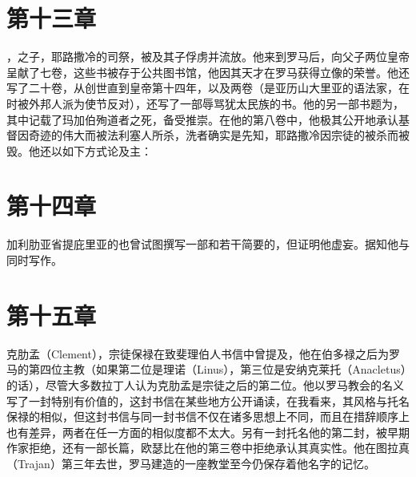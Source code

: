 
\section{第十三章}

，之子，耶路撒冷的司祭，被及其子俘虏并流放。他来到罗马后，向父子两位皇帝呈献了七卷，这些书被存于公共图书馆，他因其天才在罗马获得立像的荣誉。他还写了二十卷，从创世直到皇帝第十四年，以及两卷（是亚历山大里亚的语法家，在时被外邦人派为使节反对），还写了一部辱骂犹太民族的书。他的另一部书题为，其中记载了玛加伯殉道者之死，备受推崇。在他的第八卷中，他极其公开地承认基督因奇迹的伟大而被法利塞人所杀，洗者确实是先知，耶路撒冷因宗徒的被杀而被毁。他还以如下方式论及主：\par


\section{第十四章}

加利肋亚省提庇里亚的也曾试图撰写一部和若干简要的，但证明他虚妄。据知他与同时写作。\par


\section{第十五章}

克肋孟（Clement），宗徒保禄在致斐理伯人书信中曾提及，他在伯多禄之后为罗马的第四位主教（如果第二位是理诺（Linus），第三位是安纳克莱托（Anacletus）的话），尽管大多数拉丁人认为克肋孟是宗徒之后的第二位。他以罗马教会的名义写了一封特别有价值的，这封书信在某些地方公开诵读，在我看来，其风格与托名保禄的相似，但这封书信与同一封书信不仅在诸多思想上不同，而且在措辞顺序上也有差异，两者在任一方面的相似度都不太大。另有一封托名他的第二封，被早期作家拒绝，还有一部长篇，欧瑟比在他的第三卷中拒绝承认其真实性。他在图拉真（Trajan）第三年去世，罗马建造的一座教堂至今仍保存着他名字的记忆。\par

